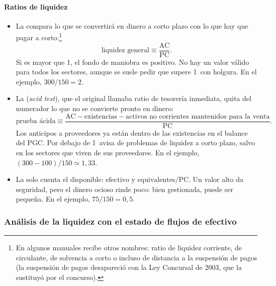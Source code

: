 \documentclass[11pt]{article}
\begin{document}
\begin{infografia}[H]
\centering
\caption{El ciclo de explotación y sus periodos medios}\label{figu:ciclo-explotacion}
\end{infografia}

\paragraph{Ratios de liquidez}

\begin{itemize}
\item La  compara lo que se convertirá en dinero a corto plazo con lo que hay que pagar a corto:\footnote{En algunos manuales recibe otros nombres: ratio de liquidez corriente, de circulante, de solvencia a corto o incluso de distancia a la suspensión de pagos (la suspensión de pagos desapareció con la Ley Concursal de 2003, que la sustituyó por el concurso).}
  \[
  \text{liquidez general}\equiv\frac{\mathrm{AC}}{\mathrm{PC}}.
  \]
  Si es mayor que 1, el fondo de maniobra es positivo. No hay un valor válido para todos los sectores, aunque se suele pedir que supere 1~con holgura. En el ejemplo, $300/150=2$.
\item La  (\emph{acid test}), que el original llamaba ratio de tesorería inmediata, quita del numerador lo que no se convierte pronto en dinero:
  \[
  \text{prueba ácida}\equiv\frac{\mathrm{AC}-\text{existencias}-\text{activos no corrientes mantenidos para la venta}}{\mathrm{PC}}.
  \]
  Los anticipos a proveedores ya están dentro de las existencias en el balance del PGC. Por debajo de 1~avisa de problemas de liquidez a corto plazo, salvo en los sectores que viven de sus proveedores. En el ejemplo, $(300-100)/150\simeq1{,}33$.
\item La  solo cuenta el disponible: $\text{efectivo y equivalentes}/\mathrm{PC}$. Un valor alto da seguridad, pero el dinero ocioso rinde poco: bien gestionada, puede ser pequeña. En el ejemplo, $75/150=0{,}5$.
\end{itemize}

\subsubsection{Análisis de la liquidez con el estado de flujos de efectivo}\label{sec:liquidez-efe}
\end{document}
